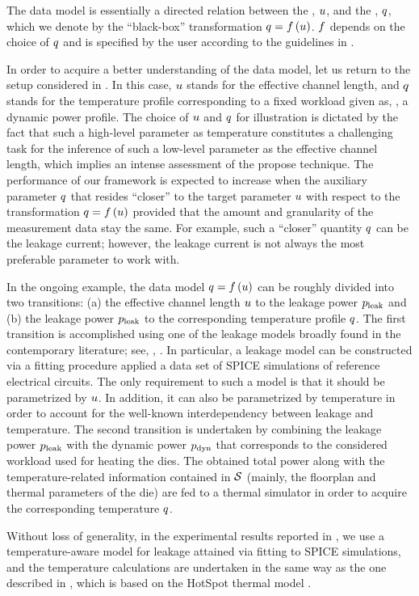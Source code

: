 The data model is essentially a directed relation between the \qoi, $u$, and the \qom, $q$, which we denote by the ``black-box'' transformation $\q = \oBB{\u}$.
$\oBB$ depends on the choice of $q$ and is specified by the user according to the guidelines in .

In order to acquire a better understanding of the data model, let us return to the setup considered in .
In this case, $u$ stands for the effective channel length, and $q$ stands for the temperature profile corresponding to a fixed workload given as, \eg, a dynamic power profile.
The choice of $u$ and $q$ for illustration is dictated by the fact that such a high-level parameter as temperature constitutes a challenging task for the inference of such a low-level parameter as the effective channel length, which implies an intense assessment of the propose technique.
The performance of our framework is expected to increase when the auxiliary parameter $q$ that resides ``closer'' to the target parameter $u$ with respect to the transformation $\q = \oBB{\u}$ provided that the amount and granularity of the measurement data stay the same.
For example, such a ``closer'' quantity $q$ can be the leakage current; however, the leakage current is not always the most preferable parameter to work with.

In the ongoing example, the data model $\q = \oBB{\u}$ can be roughly divided into two transitions: (a) the effective channel length $u$ to the leakage power $p_{\text{leak}}$ and (b) the leakage power $p_{\text{leak}}$ to the corresponding temperature profile $q$.
The first transition is accomplished using one of the leakage models broadly found in the contemporary literature; see, \eg, \cite{chandrakasan2001, srivastava2010, juan2012}.
In particular, a leakage model can be constructed via a fitting procedure applied a data set of SPICE simulations of reference electrical circuits.
The only requirement to such a model is that it should be parametrized by $u$.
In addition, it can also be parametrized by temperature in order to account for the well-known interdependency between leakage and temperature.
The second transition is undertaken by combining the leakage power $p_{\text{leak}}$ with the dynamic power $p_{\text{dyn}}$ that corresponds to the considered workload used for heating the dies.
The obtained total power along with the temperature-related information contained in $\mathcal{S}$ (mainly, the floorplan and thermal parameters of the die) are fed to a thermal simulator in order to acquire the corresponding temperature $q$.

Without loss of generality, in the experimental results reported in , we use a temperature-aware model for leakage attained via fitting to SPICE simulations, and the temperature calculations are undertaken in the same way as the one described in \cite{ukhov2012}, which is based on the HotSpot thermal model \cite{hotspot}.

